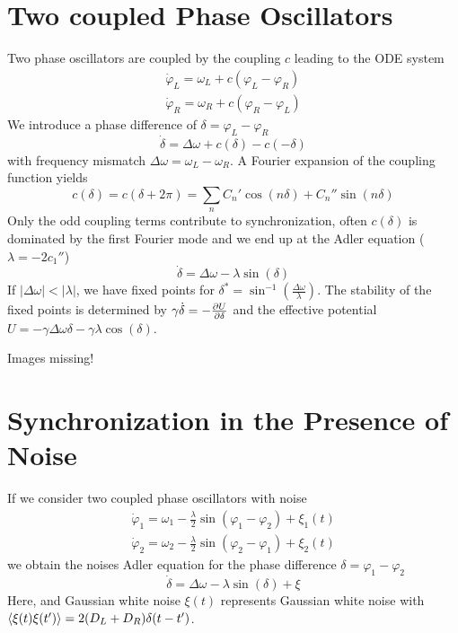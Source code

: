 \documentclass{notebook}
\begin{document}
\section{Two coupled Phase Oscillators}

Two phase oscillators are coupled by the coupling $c$ leading to the ODE system
%
\begin{equation}
%
\begin{gathered}
\dot{\varphi}_L = \omega_L + c(\varphi_L - \varphi_R) \\
\dot{\varphi}_R = \omega_R + c(\varphi_R - \varphi_L)
\end{gathered}
%
\end{equation}
%
We introduce a phase difference of $\delta = \varphi_L - \varphi_R$
%
\begin{equation}
\dot{\delta} = \Delta \omega + c(\delta) - c(-\delta)
\end{equation}
%
with frequency mismatch $\Delta \omega = \omega_L - \omega_R$. A Fourier expansion of the coupling function yields 
%
\begin{equation}
c(\delta) = c(\delta + 2 \pi) = \sum_n{C_n' \cos(n \delta) + C_n'' \sin(n \delta)}
\end{equation}
%
Only the odd coupling terms contribute to synchronization, often $c(\delta)$ is dominated by the first Fourier mode and we end up at the Adler equation ($\lambda = - 2 c_1''$)
%
\begin{equation}
\dot{\delta} = \Delta \omega - \lambda \sin(\delta)
\end{equation}
%
If $|\Delta \omega| < |\lambda|$, we have fixed points for $\delta^* = \sin^{-1} \left( \frac{\Delta \omega}{\lambda} \right)$. The stability of the fixed points is determined by $\gamma \dot{\delta} = - \pdv{U}{\delta}$ and the effective potential $U = -\gamma \Delta \omega \delta - \gamma \lambda \cos(\delta)$. 

Images missing!



\section{Synchronization in the Presence of Noise}

If we consider two coupled phase oscillators with noise
%
\begin{gather}
	\dot{\varphi}_1 = \omega_1 - \frac{\lambda}{2} \sin(\varphi_1 - \varphi_2) + \xi_1(t) \\
	\dot{\varphi}_2 = \omega_2 - \frac{\lambda}{2} \sin(\varphi_2 - \varphi_1) + \xi_2(t)
\end{gather}
%
we obtain the noises Adler equation for the phase difference $\delta = \varphi_1 - \varphi_2$
%
\begin{equation}
\dot{\delta} = \Delta \omega - \lambda \sin(\delta) + \xi
\end{equation}
%
Here, and Gaussian white noise $\xi(t)$ represents Gaussian white noise with $\expval{\xi(t)\xi(t')} = 2 (D_L + D_R) \delta(t-t')$.
\end{document}
